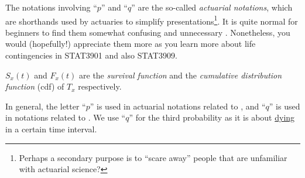\begin{enumerate}
The notations involving ``\(p\)'' and ``\(q\)'' are the so-called
\emph{actuarial notations}, which are shorthands used by actuaries to simplify
presentations\footnote{Perhaps a secondary purpose is to ``scare away'' people
that are unfamiliar with actuarial science?  }. It
is quite normal for beginners to find them somewhat confusing and unnecessary
.  Nonetheless, you would (hopefully!) appreciate them
more as you learn more about life contingencies in STAT3901 and also STAT3909.

\begin{remark}
\item \(S_x(t)\) and \(F_x(t)\) are the \emph{survival function} and the
\emph{cumulative distribution function} (cdf) of \(T_x\) respectively.  \item
In general, the letter ``\(p\)'' is used in actuarial notations related to
, and ``\(q\)'' is used in notations related to
. We use ``\(q\)'' for the third probability as it is
about \underline{dying} in a certain time interval.
\end{remark}


\end{enumerate}
